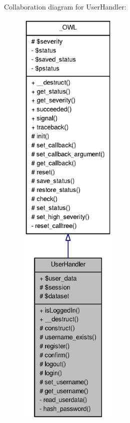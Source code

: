 Collaboration diagram for UserHandler:\nopagebreak
\begin{figure}[H]
\begin{center}
\leavevmode
\includegraphics[height=600pt]{classUserHandler__coll__graph}
\end{center}
\end{figure}
